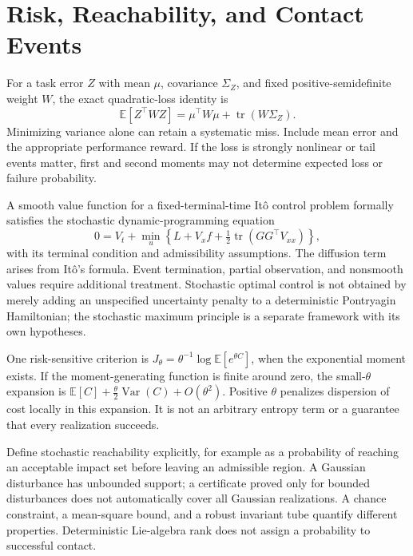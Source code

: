\section{Risk, Reachability, and Contact Events}

For a task error $Z$ with mean $\mu$, covariance $\Sigma_Z$, and fixed positive-semidefinite weight $W$, the exact quadratic-loss identity is
\begin{equation}
\mathbb E[Z^\top WZ]=\mu^\top W\mu+\operatorname{tr}(W\Sigma_Z).
\end{equation}
Minimizing variance alone can retain a systematic miss. Include mean error and the appropriate performance reward. If the loss is strongly nonlinear or tail events matter, first and second moments may not determine expected loss or failure probability.

A smooth value function for a fixed-terminal-time Itô control problem formally satisfies the stochastic dynamic-programming equation
\begin{equation}
0=V_t+\min_u\left\{L+V_x f+
\tfrac12\operatorname{tr}(GG^\top V_{xx})\right\},
\end{equation}
with its terminal condition and admissibility assumptions. The diffusion term arises from Itô's formula. Event termination, partial observation, and nonsmooth values require additional treatment. Stochastic optimal control is not obtained by merely adding an unspecified uncertainty penalty to a deterministic Pontryagin Hamiltonian; the stochastic maximum principle is a separate framework with its own hypotheses.

One risk-sensitive criterion is $J_\theta=\theta^{-1}\log\mathbb E[e^{\theta C}]$, when the exponential moment exists. If the moment-generating function is finite around zero, the small-$\theta$ expansion is $\mathbb E[C]+\tfrac{\theta}{2}\operatorname{Var}(C)+O(\theta^2)$. Positive $\theta$ penalizes dispersion of cost locally in this expansion. It is not an arbitrary entropy term or a guarantee that every realization succeeds.

Define stochastic reachability explicitly, for example as a probability of reaching an acceptable impact set before leaving an admissible region. A Gaussian disturbance has unbounded support; a certificate proved only for bounded disturbances does not automatically cover all Gaussian realizations. A chance constraint, a mean-square bound, and a robust invariant tube quantify different properties. Deterministic Lie-algebra rank does not assign a probability to successful contact.

